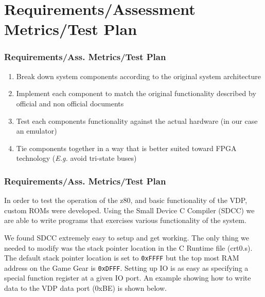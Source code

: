 \documentclass{beamer}
\newlength{\wideitemsep}
\let\olditem\item
\renewcommand{\item}{\setlength{\itemsep}{\wideitemsep}\olditem}
\begin{document}
\section{Requirements/Assessment Metrics/Test Plan}
\begin{frame}
    \frametitle{Requirements/Ass. Metrics/Test Plan}
    \begin{enumerate}
        \item<1-> Break down system components according to the original system architecture
        \item<2-> Implement each component to match the original functionality described by official and
            non official documents
        \item<3-> Test each components functionality against the actual hardware (in our case an emulator)
        \item<4-> Tie components together in a way that is better suited toward FPGA technology (\emph{E.g.} avoid tri-state buses)
    \end{enumerate}
\end{frame}

\begin{frame}
    \frametitle{Requirements/Ass. Metrics/Test Plan}
    In order to test the operation of the z80, and basic functionality of the VDP,
    custom ROMs were developed. Using the Small Device C Compiler (SDCC)
    \cite{SDCC} we are able to write programs that exercises various functionality
    of the system.

    We found SDCC extremely easy to setup and get working. The only thing we needed
    to modify was the stack pointer location in the C Runtime file (crt0.s). The
    default stack pointer location is set to \texttt{0xFFFF} but the top most RAM
    address on the Game Gear is \texttt{0xDFFF}. Setting up IO is as easy as
    specifying a special function register at a given IO port. An example showing
    how to write data to the VDP data port (0xBE) is shown below.
\end{frame}

\end{document}

